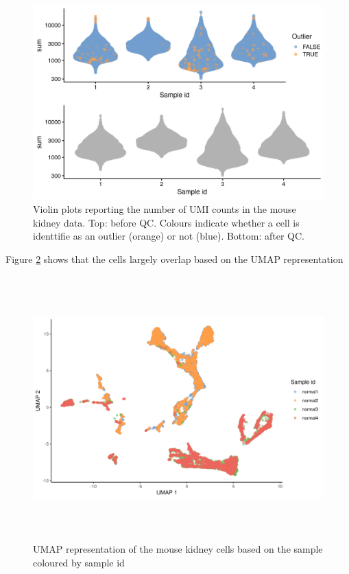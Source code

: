 \begin{figure}[!htb]
\begin{center}
\includegraphics{figure/kidney_mouse/qc_mouse.png}
\end{center}
\caption{Violin plots reporting the number of UMI counts in the mouse kidney data. Top: before QC. Colours indicate whether a cell is identtifie as an outlier (orange) or not (blue). Bottom: after QC.}
\label{fig:QC_mouse}
\end{figure}
\FloatBarrier


Figure \ref{fig:UMAP_mouse_sample}  shows that the cells largely overlap based on the UMAP representation 

\begin{figure}[!htb]
\begin{center}
\includegraphics[width=6in,height=4in]{figure/kidney_mouse/UMAP_sample_id.png}
\end{center}
\caption{UMAP representation of the mouse kidney cells based on the sample coloured by sample id}
\label{fig:UMAP_mouse_sample}
\end{figure}
\FloatBarrier

